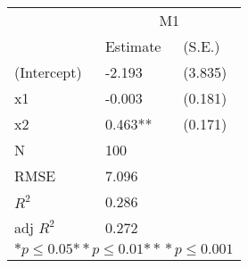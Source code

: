 \begin{tabular}{*{3}{l}}
\hline
                  & \multicolumn{2}{c}{M1}   \tabularnewline
                   &Estimate  &(S.E.)  \tabularnewline
 \hline
 \hline
   (Intercept)     &-2.193   &   (3.835) \tabularnewline
   x1              &-0.003   &   (0.181) \tabularnewline
   x2              &0.463**   &   (0.171) \tabularnewline
 \hline
 N                 &100       &        \tabularnewline
 RMSE             &7.096         & \tabularnewline
 $R^2$             &0.286         & \tabularnewline
 adj $R^2$         &0.272         & \tabularnewline
 \hline
\hline
 
 \multicolumn{3}{c}{${*  p}\le 0.05$${*\!\!*  p}\le 0.01$${*\!\!*\!\!*  p}\le 0.001$}\tabularnewline
 \end{tabular}